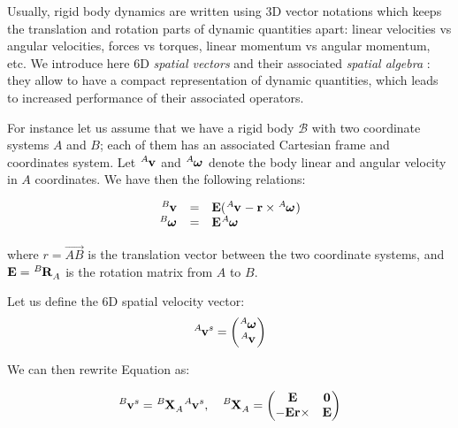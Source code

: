 Usually, rigid body dynamics are written using 3D vector notations
which keeps the translation and rotation parts of dynamic quantities
apart: linear velocities vs angular velocities, forces vs torques,
linear momentum vs angular momentum, etc. We introduce here 6D
\emph{spatial vectors} and their associated \emph{spatial algebra}
\cite{feat08}: they allow to have a compact representation of dynamic
quantities, which leads to increased performance of their associated
operators.

For instance let us assume that we have a rigid body $\mathcal{B}$
with two coordinate systems $A$ and $B$; each of them has an
associated Cartesian frame and coordinates system. Let
$\tensor*[^A]{\mathbf{v}}{}$ and $\tensor*[^A]{\boldsymbol{\omega}}{}$
denote the body linear and angular velocity in $A$ coordinates. We
have then the following relations:

\begin{equation}
\label{eq:chap3-transf-3d-vectors}
\begin{array}{rcl}
  \tensor*[^B]{\mathbf{v}}{} &=&
  \mathbf{E}(\tensor*[^A]{\mathbf{v}}{} -
  \mathbf{r}\times\tensor*[^A]{\boldsymbol{\omega}}{})\\%
  \tensor*[^B]{\boldsymbol{\omega}}{} &=&
  \mathbf{E}\tensor*[^A]{\boldsymbol{\omega}}{}
\end{array}
\end{equation}

\noindent where $r=\overset{\longrightarrow}{AB}$ is the translation vector
between the two coordinate systems, and $\mathbf{E} =
\tensor*[^B]{\mathbf{R}}{_A}$ is the rotation matrix from $A$ to $B$.

Let us define the 6D spatial velocity vector:
\begin{equation}
  \tensor*[^A]{\mathbf{v}}{^s}=
  \left(\begin{matrix}
    \tensor*[^A]{\boldsymbol{\omega}}{}\\
    \tensor*[^A]{\mathbf{v}}{}
  \end{matrix}\right)
\end{equation}

We can then rewrite Equation  as:

\begin{equation}
  \tensor*[^B]{\mathbf{v}}{^s}=
  \tensor*[^B]{\mathbf{X}}{_A}
  \tensor*[^A]{\mathbf{v}}{^s}
  ,\quad
  \tensor*[^B]{\mathbf{X}}{_A}=
    \left(\begin{matrix}
    \mathbf{E} & \mathbf{0} \\
    -\mathbf{E}\mathbf{r}\times & \mathbf{E}
  \end{matrix}\right)
\end{equation}

